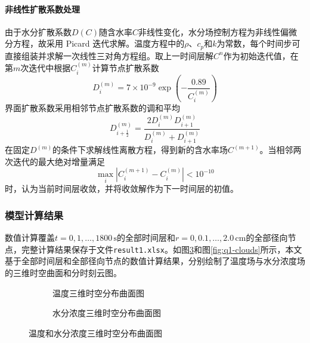 \documentclass[withoutpreface,bwprint]{cumcmthesis}
\begin{document}
\paragraph{非线性扩散系数处理}
由于水分扩散系数$D(C)$随含水率$C$非线性变化，水分场控制方程为非线性偏微分方程，故采用 Picard 迭代求解。温度方程中的$\rho$、$c_p$和$k$为常数，每个时间步可直接组装并求解一次线性三对角方程组。取上一时间层解$C^n$作为初始迭代值，在第$m$次迭代中根据$C_i^{(m)}$计算节点扩散系数
\begin{equation}
D_i^{(m)}=7\times10^{-9}\exp\left(-\frac{0.89}{C_i^{(m)}}\right)
\label{eq:q1-picard-diffusivity}
\end{equation}
界面扩散系数采用相邻节点扩散系数的调和平均
\begin{equation}
D_{i+\frac12}^{(m)}
=\frac{2D_i^{(m)}D_{i+1}^{(m)}}{D_i^{(m)}+D_{i+1}^{(m)}}
\label{eq:q1-harmonic-diffusivity}
\end{equation}
在固定$D^{(m)}$的条件下求解线性离散方程，得到新的含水率场$C^{(m+1)}$。当相邻两次迭代的最大绝对增量满足
\begin{equation}
\max_i\left|C_i^{(m+1)}-C_i^{(m)}\right|<10^{-10}
\label{eq:q1-picard-convergence}
\end{equation}
时，认为当前时间层收敛，并将收敛解作为下一时间层的初值。


\subsubsection{模型计算结果}

数值计算覆盖$t=0,1,\ldots,1800\,\mathrm{s}$的全部时间层和$r=0,0.1,\ldots,2.0\,\mathrm{cm}$的全部径向节点，完整计算结果保存于文件\texttt{result1.xlsx}。如图\ref{fig:q1-3d-surfaces}和图\ref{fig:q1-clouds}所示，本文基于全部时间层和全部径向节点的数值计算结果，分别绘制了温度场与水分浓度场的三维时空曲面和分时刻云图。

\begin{figure}[H]
\centering
\begin{subfigure}[b]{0.48\textwidth}
\centering

\caption{温度三维时空分布曲面图}
\label{fig:q1-temperature-surface}
\end{subfigure}
\hfill
\begin{subfigure}[b]{0.48\textwidth}
\centering

\caption{水分浓度三维时空分布曲面图}
\label{fig:q1-moisture-surface}
\end{subfigure}
\caption{温度和水分浓度三维时空分布曲面图}
\label{fig:q1-3d-surfaces}
\end{figure}
\end{document}
